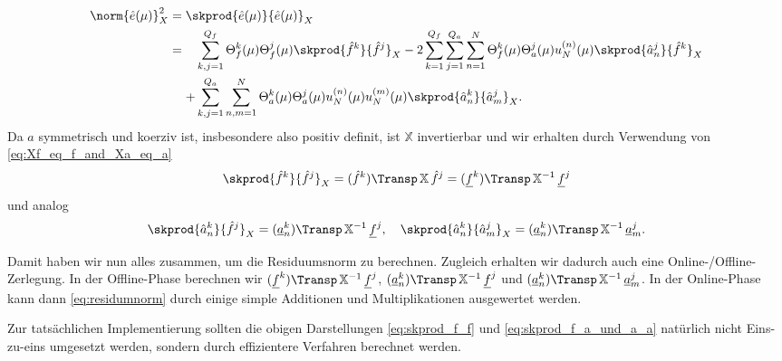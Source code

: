 \begin{align}
    \label{eq:residumnorm}
    \norm{\hat e(\mu)}^2_X
    &= \skprod{\hat e(\mu)}{\hat e(\mu)}_X \\
    &=
    \begin{aligned}[t]
    &\sum_{k, j = 1}^{Q_f} \Theta_f^k(\mu) \Theta_f^j(\mu) \skprod{\hat f^k}{\hat f^j}_X - 2 \sum_{k = 1}^{Q_f} \sum_{j = 1}^{Q_a} \sum_{n = 1}^N \Theta_f^k(\mu) \Theta_a^j(\mu) u_N^{(n)}(\mu) \skprod{\hat a^j_n}{\hat f^k}_X \\
    + &\sum_{k, j = 1}^{Q_a} \sum_{n, m = 1}^N \Theta_a^k(\mu) \Theta_a^j(\mu) u_N^{(n)}(\mu)u_N^{(m)}(\mu) \skprod{\hat a_n^k}{\hat a_m^j}_X.
    \end{aligned}
\end{align}
Da $a$ symmetrisch und koerziv ist, insbesondere also positiv definit, ist $\mathbb{X}$ invertierbar und wir erhalten durch Verwendung von \eqref{eq:Xf_eq_f_and_Xa_eq_a}
\begin{equation}
    \label{eq:skprod_f_f}
    \skprod{\hat f^k}{\hat f^j}_X = (\hat f^k)\Transp \, \mathbb{X} \, \hat f^j = (\underline f^k)\Transp \, \mathbb{X}^{-1} \, \underline f^j
\end{equation}
und analog
\begin{equation}
    \label{eq:skprod_f_a_und_a_a}
    \skprod{\hat a^k_n}{\hat f^j}_X = (\underline a^k_n)\Transp \, \mathbb{X}^{-1} \, \underline f^j,
    \quad \skprod{\hat a^k_n}{\hat a^j_m}_X = (\underline a^k_n)\Transp \, \mathbb{X}^{-1} \, \underline a^j_m.
\end{equation}

Damit haben wir nun alles zusammen, um die Residuumsnorm zu berechnen. Zugleich erhalten wir dadurch auch eine Online-/Offline-Zerlegung. In der Offline-Phase berechnen wir $(\underline f^k)\Transp \, \mathbb{X}^{-1} \, \underline f^j$, $(\underline a^k_n)\Transp \, \mathbb{X}^{-1} \, \underline f^j$ und $(\underline a^k_n)\Transp \, \mathbb{X}^{-1} \, \underline a^j_m$. In der Online-Phase kann dann \eqref{eq:residumnorm} durch einige simple Additionen und Multiplikationen ausgewertet werden.

Zur tatsächlichen Implementierung sollten die obigen Darstellungen \eqref{eq:skprod_f_f} und \eqref{eq:skprod_f_a_und_a_a} natürlich nicht Eins-zu-eins umgesetzt werden, sondern durch effizientere Verfahren berechnet werden.

